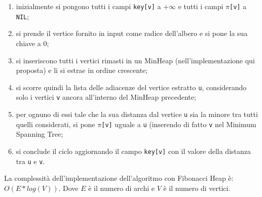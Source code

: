 \begin{enumerate}
	\item inizialmente si pongono tutti i campi \texttt{key[v]} a +$\infty$ e tutti i campi \texttt{$\pi$[v]} a \texttt{NIL};
	\item si prende il vertice fornito in input come radice dell'albero e si pone la sua chiave a 0;
	\item si inseriscono tutti i vertici rimasti in un MinHeap (nell'implementazione qui proposta) e li si estrae in ordine crescente;
	\item si scorre quindi la lista delle adiacenze del vertice estratto \texttt{u}, considerando solo i vertici \texttt{v} ancora all'interno del MinHeap precedente;
	\item per ognuno di essi tale che la sua distanza dal vertice \texttt{u} sia la minore tra tutti quelli considerati, si pone \texttt{$\pi$[v]} uguale a \texttt{u} (inserendo di fatto \texttt{v} nel Minimum Spanning Tree;
	\item si conclude il ciclo aggiornando il campo \texttt{key[v]} con il valore della distanza tra \texttt{u} e \texttt{v}.
\end{enumerate}
La complessità dell'implementazione dell'algoritmo con Fibonacci Heap è: $O(E*log(V))$. Dove $E$ è il numero di archi e $V$ è il numero di vertici.

